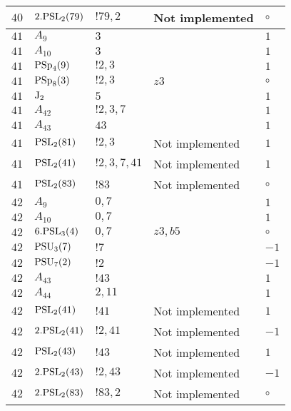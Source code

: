 \documentclass[a4paper, 11pt]{article}
\begin{document}
\begin{longtable}{lllll}
        $ 40 $ & $ 2.{\rm PSL}_{2}(79) $ & $ !79, 2 $ &  Not implemented &  $\circ$ \\ \hline
        $ 41 $ & $ A_{9} $ & $ 3 $ & $ ~ $ & $ 1$ \\ \hline
        $ 41 $ & $ A_{10} $ & $ 3 $ & $ ~ $ & $ 1$ \\ \hline
        $ 41 $ & $ {\rm PSp}_{4}(9) $ & $ ! 2,3 $ & $ ~ $ & $ 1$ \\ \hline
        $ 41 $ & $ {\rm PSp}_{8}(3) $ & $ ! 2,3 $ & $ z3 $ &  $\circ$ \\ \hline
        $ 41 $ & $ {\rm J}_2 $ & $ 5 $ & $ ~ $ & $ 1$ \\ \hline
        $ 41 $ & $ A_{42} $ & $ !2, 3, 7 $ & $ ~ $ & $ 1$ \\ \hline
        $ 41 $ & $ A_{43} $ & $ 43 $ & $ ~ $ & $ 1$ \\ \hline
        $ 41 $ & $ {\rm PSL}_{2}(81) $ & $ !2, 3 $ &  Not implemented & $ 1$ \\ \hline
        $ 41 $ & $ {\rm PSL}_{2}(41) $ & $ !2, 3, 7, 41 $ &  Not implemented & $ 1$ \\ \hline
        $ 41 $ & $ {\rm PSL}_{2}(83) $ & $ !83 $ &  Not implemented &  $\circ$ \\ \hline
        $ 42 $ & $ A_{9} $ & $ 0,7 $ & $ ~ $ & $ 1$ \\ \hline
        $ 42 $ & $ A_{10} $ & $ 0,7 $ & $ ~ $ & $ 1$ \\ \hline
        $ 42 $ & $ 6.{\rm PSL}_{3}(4) $ & $ 0,7 $ & $ z3, b5 $ &  $\circ$ \\ \hline
        $ 42 $ & $ {\rm PSU}_{3}(7) $ & $ ! 7 $ & $ ~ $ & $ -1$ \\ \hline
        $ 42 $ & $ {\rm PSU}_{7}(2) $ & $ ! 2 $ & $ ~ $ & $ -1$ \\ \hline
        $ 42 $ & $ A_{43} $ & $ !43 $ & $ ~ $ & $ 1$ \\ \hline
        $ 42 $ & $ A_{44} $ & $ 2, 11 $ & $ ~ $ & $ 1$ \\ \hline
        $ 42 $ & $ {\rm PSL}_{2}(41) $ & $ !41 $ &  Not implemented & $ 1$ \\ \hline
        $ 42 $ & $ 2.{\rm PSL}_{2}(41) $ & $ !2, 41 $ &  Not implemented & $ -1$ \\ \hline
        $ 42 $ & $ {\rm PSL}_{2}(43) $ & $ !43 $ &  Not implemented & $ 1$ \\ \hline
        $ 42 $ & $ 2.{\rm PSL}_{2}(43) $ & $ !2, 43 $ &  Not implemented & $ -1$ \\ \hline
        $ 42 $ & $ 2.{\rm PSL}_{2}(83) $ & $ !83, 2 $ &  Not implemented &  $\circ$ \\ \hline

\end{longtable}
\end{document}
